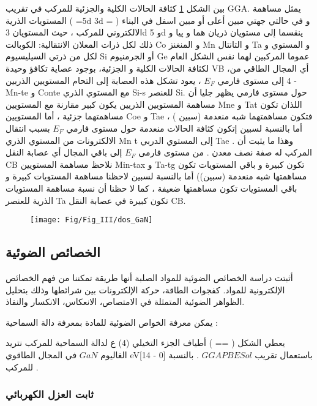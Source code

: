 بين الشكل \ref{fig:dosgan} كثافة الحالات الكلية والجزئية للمركب في تقريب GGA. يمثل مساهمة المستويات الذرية ( =5d 3d = ) و في حالتي جهتي مبين أعلى أو مبين اسفل في البناء الالكتروني للمركب ، حيث المستويان 3d و 5d ينقسما إلى مستويان ذريان هما و پيا و ذلك لكل ذرات المعلان الانتقالية: الكوبالت Co و المنغنز Mn و التانتال Ta و المستوي و لكل من ذرتي السيليسيوم Si أو الجرمنيوم Ge عموما المركبين لهما نفس الشكل العام لكثافة الحالات الكلية و الجزئية، بوجود عصاية تكافؤ وحيدة VB ،أي المجال الطاقي من - 4 إلى مستوى فارمي $ E_{F} $ ، يعود تشكل هذه العصابة إلى التحام المستويين الذربين Mn-te و Conte مع المستوي الذري Si-s للعنصر Si. حول مستوى فارمي يظهر جليا أن مساهمة المستويين الذريين  يكون كبير مقارنة مع المستويين Mne و Tat اللذان تكون مساهمتهما جزئية ، أما المستويين Coe و Tae فتكون مساهمتهما شبه منعدمة (سبين ) ، أما بالنسبة لسبين إتكون كثافة الحالات منعدمة حول مستوى فارمي $ E_{F} $ بسبب انتقال الالكترونات من المستوي الذري Mn t إلى المستوي الدربي Tae . وهذا ما يثبت أن المركب له صفة نصف معدن . من مستوى فارمی $ E_{F} $ إلى باقي المجال أي عصابة النقل CB نلاحظ مساهمة المستويين Min-tax و Ta-tg تكون كبيرة و باقي المستويات تكون مساهمتها شبه منعدمة (سبين)) أما بالنسبة لسبين لاحظنا مساهمة المستويات كبيرة و باقي المستويات تكون مساهمتها ضعيفة ، كما لا حظنا أن نسبة مساهمة المستويات الذرية للعنصر Ta تكون كبيرة في عصابة النقل CB.

\begin{figure}[h!]
	\centering
	\texttt{[image: Fig/Fig\_III/dos\_GaN]}
	\caption{}
	\label{fig:dosgan}
\end{figure}
\FloatBarrier

\subsection{الخصائص الضوئية}

أثبتت دراسة الخصائص الضوئية للمواد الصلبة أنها طريقة تمكننا من فهم الخصائص الإلكترونية للمواد. كفجوات الطاقة، حركة الإلكترونات بين شرائطها وذلك بتحليل الظواهر الضوئية المتمثلة في الامتصاص، الانعكاس، الانكسار والنفاذ.

يمكن معرفة الخواص الضوئية للمادة بمعرفة دالة السماحية :

يعطي الشكل ( == ) أطياف الجزء التخيلي (4) ع لدالة السماحية للمركب نتريد الغاليوم  $ GaN  $  في المجال الطاقوي eV[14 - 0] باستعمال تقريب $ GGAPBESol $ .
بالنسبة للمركب . 

\subsubsection{ثابت العزل الكهربائي }

